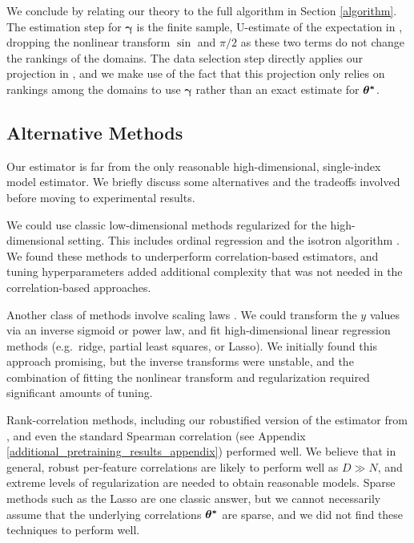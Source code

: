 \documentclass{article} %
\begin{document}
We conclude by relating our theory to the full algorithm in Section \ref{algorithm}. The estimation step for $\bm{\gamma}$ is the finite sample, U-estimate of the expectation in , dropping the nonlinear transform $\sin$ and $\pi/2$ as these two terms do not change the rankings of the domains. The data selection step directly applies our projection in , and we make use of the fact that this projection only relies on rankings among the domains to use $\bm{\gamma}$ rather than an exact estimate for $\bm{{\bf{\theta}^*}}$. 

\subsection{Alternative Methods}

Our estimator is far from the only reasonable high-dimensional, single-index model estimator. We briefly discuss some alternatives and the tradeoffs involved before moving to experimental results.

We could use classic low-dimensional methods regularized for the high-dimensional setting. This includes ordinal regression \citep{ordinalregression} and the isotron algorithm \citep{isotron}. We found these methods to underperform correlation-based estimators, and tuning hyperparameters added additional complexity that was not needed in the correlation-based approaches.

Another class of methods involve scaling laws \citep{kaplan2020scaling, llama3, ruan2024observationalscalinglawspredictability}. We could transform the $y$ values via an inverse sigmoid or power law, and fit high-dimensional linear regression methods (e.g.\ ridge, partial least squares, or Lasso). We initially found this approach promising, but the inverse transforms were unstable, and the combination of fitting the nonlinear transform and regularization required significant amounts of tuning.

Rank-correlation methods, including our robustified version of the estimator from \citet{chen2017robust}, and even the standard Spearman correlation \citep{spearmanr} (see Appendix \ref{additional_pretraining_results_appendix}) performed well. We believe that in general, robust per-feature correlations are likely to perform well as $D \gg N$, and extreme levels of regularization are needed to obtain reasonable models. Sparse methods such as the Lasso \citep{tibshirani1996regression} are one classic answer, but we cannot necessarily assume that the underlying correlations $\bm{{\bf{\theta}^*}}$ are sparse, and we did not find these techniques to perform well.
\end{document}
